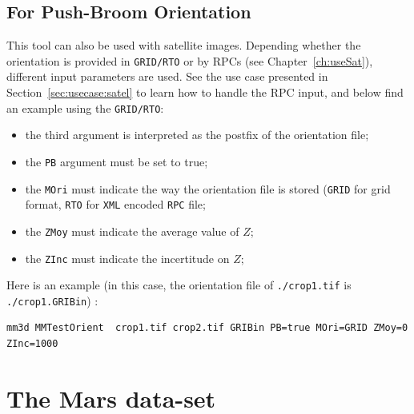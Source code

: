 \subsection{For Push-Broom Orientation}
\label{TestOri:PB}

This tool can also be used with satellite images. Depending whether the orientation is provided in {\tt GRID/RTO} or by RPCs (see Chapter~\ref{ch:useSat}), different input parameters are used. See the use case presented in Section~\ref{sec:usecase:satel} to learn how to handle the RPC input, and below find an example using the {\tt GRID/RTO}:
\begin{itemize}
  \item the third argument is interpreted as the postfix of the orientation file;
  \item the {\tt PB} argument must be set to true;
  \item the {\tt MOri} must indicate the way the orientation file is stored ({\tt GRID} for grid format,
       {\tt RTO} for  {\tt XML} encoded {\tt RPC} file;
  \item the {\tt ZMoy} must indicate the average value of $Z$;
  \item the {\tt ZInc} must indicate the incertitude on  $Z$;
\end{itemize}

Here is an example (in this case, the orientation file of {\tt ./crop1.tif} is {\tt ./crop1.GRIBin}) :

\begin{verbatim}
mm3d MMTestOrient  crop1.tif crop2.tif GRIBin PB=true MOri=GRID ZMoy=0 ZInc=1000
\end{verbatim}


\section{The Mars data-set}

\label{Mars}



